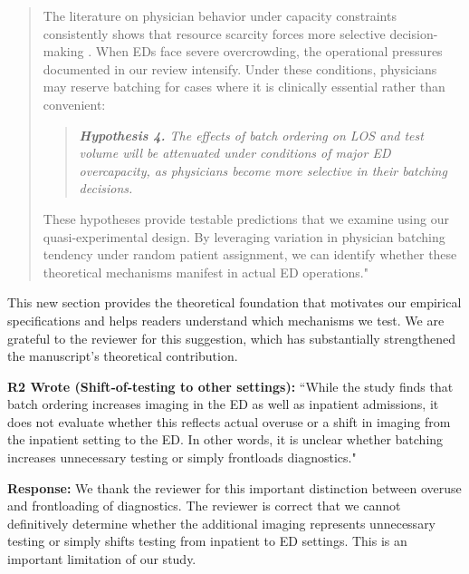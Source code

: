 \documentclass[11pt]{article}
\newenvironment{quote2}
{ \bigskip
\noindent
         \small\em
         \baselineskip=14pt
}
\newcommand{\1}{\hbox{\rm 1\kern-.35em 1}}
\begin{document}
{\begin{quote}
The literature on physician behavior under capacity constraints consistently shows that resource scarcity forces more selective decision-making \citep{kuntz2014stress, kc2009impact}. When EDs face severe overcrowding, the operational pressures documented in our review intensify. Under these conditions, physicians may reserve batching for cases where it is clinically essential rather than convenient:

\begin{quote}
\small
\textit{\textbf{Hypothesis 4.} The effects of batch ordering on LOS and test volume will be attenuated under conditions of major ED overcapacity, as physicians become more selective in their batching decisions.}
\end{quote}

These hypotheses provide testable predictions that we examine using our quasi-experimental design. By leveraging variation in physician batching tendency under random patient assignment, we can identify whether these theoretical mechanisms manifest in actual ED operations."
\end{quote}

This new section provides the theoretical foundation that motivates our empirical specifications and helps readers understand which mechanisms we test. We are grateful to the reviewer for this suggestion, which has substantially strengthened the manuscript's theoretical contribution.

\color{black}


\begin{quote2}
\textbf{R2 Wrote (Shift‑of‑testing to other settings):}  
``While the study finds that batch ordering increases imaging in the ED as well as inpatient admissions, it does not evaluate whether this reflects actual overuse or a shift in imaging from the inpatient setting to the ED. In other words, it is unclear whether batching increases unnecessary testing or simply frontloads diagnostics."

\end{quote2}

\noindent\textbf{Response:} \color{blue}We thank the reviewer for this important distinction between overuse and frontloading of diagnostics. The reviewer is correct that we cannot definitively determine whether the additional imaging represents unnecessary testing or simply shifts testing from inpatient to ED settings. This is an important limitation of our study.

}
\end{document}
